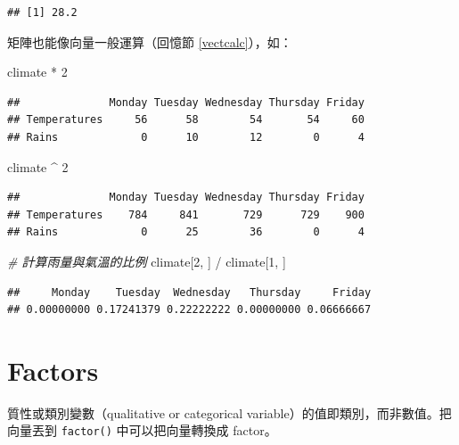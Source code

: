 \documentclass[
]{book}
\newenvironment{Shaded}{\begin{snugshade}}{\end{snugshade}}
\newcommand{\CommentTok}[1]{\textcolor[rgb]{0.56,0.35,0.01}{\textit{#1}}}
\newcommand{\DecValTok}[1]{\textcolor[rgb]{0.00,0.00,0.81}{#1}}
\newcommand{\NormalTok}[1]{#1}
\newcommand{\SpecialCharTok}[1]{\textcolor[rgb]{0.00,0.00,0.00}{#1}}
\theoremstyle{definition}
\theoremstyle{remark}
\begin{document}
\begin{verbatim}
## [1] 28.2
\end{verbatim}

矩陣也能像向量一般運算（回憶節 \ref{vectcalc}），如：

\begin{Shaded}
\begin{Highlighting}[]
\NormalTok{climate }\SpecialCharTok{*} \DecValTok{2}
\end{Highlighting}
\end{Shaded}

\begin{verbatim}
##              Monday Tuesday Wednesday Thursday Friday
## Temperatures     56      58        54       54     60
## Rains             0      10        12        0      4
\end{verbatim}

\begin{Shaded}
\begin{Highlighting}[]
\NormalTok{climate }\SpecialCharTok{\^{}} \DecValTok{2}
\end{Highlighting}
\end{Shaded}

\begin{verbatim}
##              Monday Tuesday Wednesday Thursday Friday
## Temperatures    784     841       729      729    900
## Rains             0      25        36        0      4
\end{verbatim}

\begin{Shaded}
\begin{Highlighting}[]
\CommentTok{\# 計算雨量與氣溫的比例}
\NormalTok{climate[}\DecValTok{2}\NormalTok{, ] }\SpecialCharTok{/}\NormalTok{ climate[}\DecValTok{1}\NormalTok{, ]}
\end{Highlighting}
\end{Shaded}

\begin{verbatim}
##     Monday    Tuesday  Wednesday   Thursday     Friday 
## 0.00000000 0.17241379 0.22222222 0.00000000 0.06666667
\end{verbatim}

\hypertarget{factors}{%
\section{Factors}\label{factors}}

質性或類別變數（qualitative or categorical variable）的值即類別，而非數值。把向量丟到 \texttt{factor()} 中可以把向量轉換成 factor。
\end{document}
